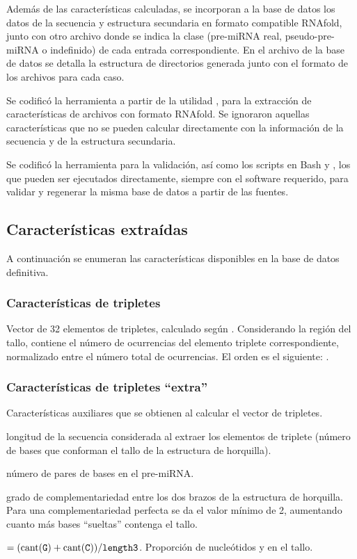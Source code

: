 \documentclass[12pt,bibliography=oldstyle,DIV=12,parskip=half-,titlepage]{scrartcl}
\begin{document}
Además de las características calculadas, se incorporan a la base de
datos los datos de la secuencia y estructura secundaria en formato
compatible RNAfold, junto con otro archivo donde se indica la clase
(pre-miRNA real, pseudo-pre-miRNA o indefinido) de cada entrada
correspondiente.  En el archivo  de la base de datos
se detalla la estructura de directorios generada junto con el formato
de los archivos para cada caso.

Se codificó la herramienta  a partir de la utilidad
, para la extracción de características de archivos
con formato RNAfold. Se ignoraron aquellas características que no se
pueden calcular directamente con la información de la secuencia y de
la estructura secundaria.

Se codificó la herramienta  para la validación, así
como los scripts en Bash  y ,
los que pueden ser ejecutados directamente, siempre con el software
requerido, para validar y regenerar la misma base de datos a partir de
las fuentes.
%
\subsection{Características extraídas}
%
A continuación se enumeran las características disponibles en la base
de datos definitiva.
%
\subsubsection{Características de tripletes}
Vector de 32 elementos de tripletes, calculado según \cite{xue}.
Considerando la región del tallo, contiene el número de ocurrencias
del elemento triplete correspondiente, normalizado entre el número
total de ocurrencias.  El orden es el siguiente: .
%
\subsubsection{Características de tripletes ``extra''}
Características auxiliares que se obtienen
al calcular el vector de tripletes.
\begin{description}[style=sameline,leftmargin=3cm]
\item[length3] longitud de la secuencia considerada al
  extraer los elementos de triplete (número de bases que
  conforman el tallo de la estructura de horquilla).
\item[basepairs] número de pares de bases en
  el pre-miRNA.
\item[{length3/basepairs}] grado de complementariedad
  entre los dos brazos de la estructura de horquilla. Para una
  complementariedad perfecta se da el valor mínimo de 2, aumentando cuanto más
  bases ``sueltas'' contenga el tallo.
\item[gc\_content] $=(\textrm{cant({\tt G})}+\textrm{cant({\tt C})})/{\tt length3}$. Proporción de nucleótidos  y
   en el tallo.
\end{description}
%
\end{document}
